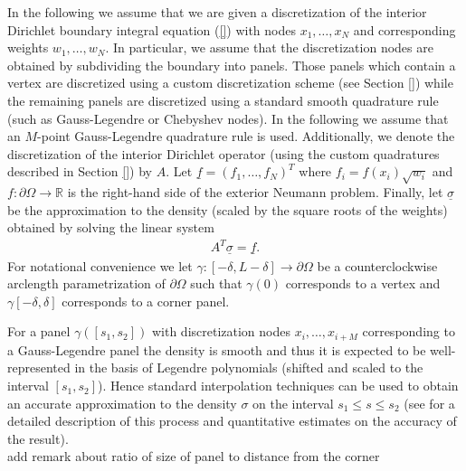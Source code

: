 In the following we assume that we are given a discretization of the interior Dirichlet boundary integral equation (\ref{}) with nodes $x_1,\dots,x_N$ and corresponding weights $w_1,\dots,w_N.$ In particular, we assume that the discretization nodes are obtained by subdividing the boundary into panels. Those panels which contain a vertex are discretized using a custom discretization scheme (see Section \ref{}) while the remaining panels are discretized using a standard smooth quadrature rule (such as Gauss-Legendre or Chebyshev nodes). In the following we assume that an $M$-point Gauss-Legendre quadrature rule is used. Additionally, we denote the discretization of the interior Dirichlet operator (using the custom quadratures described in Section \ref{}) by $A.$ Let $\underline{f} = (f_1,\dots,f_N)^T$ where $f_i = f(x_i) \sqrt{w_i}$ and $f: \partial \Omega \to \mathbb{R}$ is the right-hand side of the exterior Neumann problem. Finally, let $\underline{\sigma}$ be the approximation to the density (scaled by the square roots of the weights) obtained by solving the linear system
\begin{align}\label{eqn:adj_linalg}
A^T \underline{\sigma} = \underline{f}.
\end{align}
For notational convenience we let $\gamma:[-\delta,L-\delta] \to \partial \Omega$ be a counterclockwise arclength parametrization of $\partial \Omega$ such that  $\gamma(0)$ corresponds to a vertex and $\gamma[-\delta,\delta]$ corresponds to a corner panel.

For a panel $\gamma([s_1,s_2])$ with discretization nodes $x_i,\dots,x_{i+M}$ corresponding to a Gauss-Legendre panel the density is smooth and thus it is expected to be well-represented in the basis of Legendre polynomials (shifted and scaled to the interval $[s_1,s_2]$). Hence standard interpolation techniques can be used to obtain an accurate approximation to the density $\sigma$ on the interval $s_1 \le s\le s_2$ (see \cite{} for a detailed description of this process and quantitative estimates on the accuracy of the result).\\

{\color{red}add remark about ratio of size of panel to distance from the corner}\\

